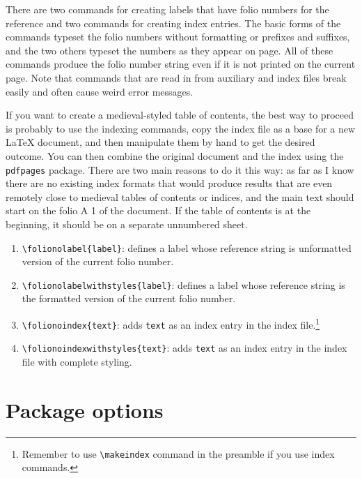 \documentclass[a4paper, 12pt]{article}
\newcommand{\feature}[1]{\texttt{#1}}
\newcommand{\command}[1]{\texttt{\textbackslash{}#1}}
\newcommand{\commandone}[2]{\texttt{\textbackslash{}#1\{#2\}}}
\begin{document}
There are two commands for creating labels that have folio numbers for
the reference and two commands for creating index entries. The basic
forms of the commands typeset the folio numbers without formatting or
prefixes and suffixes, and the two others typeset the numbers as they
appear on page. All of these commands produce the folio number string
even if it is not printed on the current page. Note that commands that
are read in from auxiliary and index files break easily and often
cause weird error messages.

If you want to create a medieval-styled table of contents, the best
way to proceed is probably to use the indexing commands, copy the
index file as a base for a new LaTeX document, and then manipulate
them by hand to get the desired outcome. You can then combine the
original document and the index using the \feature{pdfpages} package.
There are two main reasons to do it this way: as far as I know there
are no existing index formats that would produce results that are even
remotely close to medieval tables of contents or indices, and the main
text should start on the folio A 1 of the document. If the table of
contents is at the beginning, it should be on a separate unnumbered
sheet.

\begin{enumerate}
\item \commandone{folionolabel}{label}: defines a label whose
  reference string is unformatted version of the current folio number.

\item \commandone{folionolabelwithstyles}{label}: defines a label
  whose reference string is the formatted version of the current folio
  number.

\item \commandone{folionoindex}{text}: adds \feature{text} as an index
  entry in the index file.\footnote{Remember to use
    \command{makeindex} command in the preamble if you use index
    commands.}

\item \commandone{folionoindexwithstyles}{text}: adds \feature{text}
  as an index entry in the index file with complete styling.

\end{enumerate}








\section{Package options}
\end{document}
